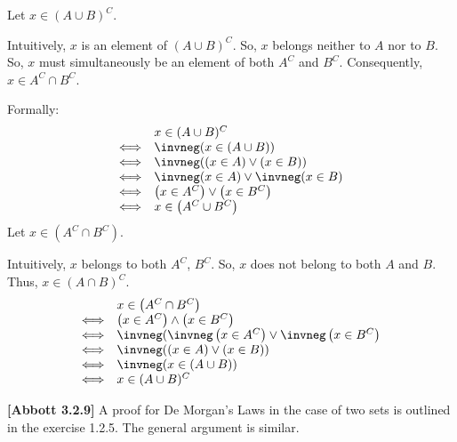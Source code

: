 \documentclass[10pt]{article}
\begin{document}
Let $\displaystyle x\in ( A\cup B)^{C}$.



Intuitively, $\displaystyle x$ is an element of $\displaystyle ( A\cup B)^{C}$. So, $\displaystyle x$ belongs neither to $\displaystyle A$ nor to $\displaystyle B$. So, $\displaystyle x$ must simultaneously be an element of both $\displaystyle A^{C}$ and $\displaystyle B^{C}$. Consequently, $\displaystyle x\in A^{C} \cap B^{C}$.



Formally:
\begin{equation*}
\begin{array}{ r l }
 & x\in ( A\cup B)^{C}\\
\Longleftrightarrow  & \invneg ( x\in ( A\cup B))\\
\Longleftrightarrow  & \invneg (( x\in A) \lor ( x\in B))\\
\Longleftrightarrow  & \invneg ( x\in A) \lor \invneg ( x\in B)\\
\Longleftrightarrow  & \left( x\in A^{C}\right) \lor \left( x\in B^{C}\right)\\
\Longleftrightarrow  & x\in \left( A^{C} \cup B^{C}\right)
\end{array}
\end{equation*}
Let $\displaystyle x\in \left( A^{C} \cap B^{C}\right)$. 



Intuitively, $\displaystyle x$ belongs to both $\displaystyle A^{C}$, $\displaystyle B^{C}$. So, $\displaystyle x$ does not belong to both $\displaystyle A$ and $\displaystyle B$. Thus, $\displaystyle x\in ( A\cap B)^{C}$. 
\begin{equation*}
\begin{array}{ c l }
 & x\in \left( A^{C} \cap B^{C}\right)\\
\Longleftrightarrow  & \left( x\in A^{C}\right) \land \left( x\in B^{C}\right)\\
\Longleftrightarrow  & \invneg ( \invneg \left( x\in A^{C}\right) \lor \invneg \left( x\in B^{C}\right)\\
\Longleftrightarrow  & \invneg (( x\in A) \lor ( x\in B))\\
\Longleftrightarrow  & \invneg ( x\in ( A\cup B))\\
\Longleftrightarrow  & x\in ( A\cup B)^{C}
\end{array}
\end{equation*}




\textbf{[Abbott 3.2.9]} A proof for De Morgan's Laws in the case of two sets is outlined in the exercise 1.2.5. The general argument is similar.
\end{document}
